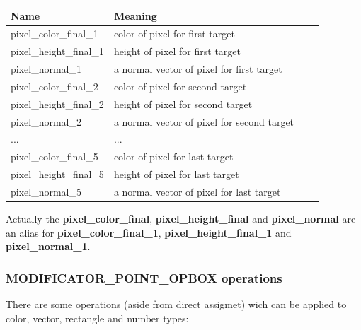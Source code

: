 \documentclass[9pt]{article}
\begin{document}
\begin{center}
\begin{tabular}{|l||l||l||l|}
\hline
Name & Meaning \\
\hline
\hline
pixel\_color\_final\_1 & color of pixel for first target \\
pixel\_height\_final\_1 & height of pixel for first target \\
pixel\_normal\_1 & a normal vector of pixel for first target \\
\hline
pixel\_color\_final\_2 & color of pixel for second target \\
pixel\_height\_final\_2 & height of pixel for second target \\
pixel\_normal\_2 & a normal vector of pixel for second target \\
\hline
... & ... \\
\hline
pixel\_color\_final\_5 & color of pixel for last target \\
pixel\_height\_final\_5 & height of pixel for last target \\
pixel\_normal\_5 & a normal vector of pixel for last target \\
\hline
\end{tabular}
\end{center}

Actually the {\bf pixel\_color\_final}, {\bf pixel\_height\_final} and {\bf pixel\_normal}
are an alias for {\bf pixel\_color\_final\_1}, {\bf pixel\_height\_final\_1} and {\bf pixel\_normal\_1}.

\subsubsection*{MODIFICATOR\_POINT\_OPBOX operations}

There are some operations (aside from direct assigmet) wich can be applied to 
color, vector, rectangle and number types:
\end{document}
